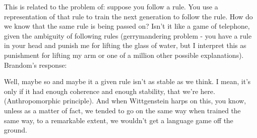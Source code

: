 This is related to the problem of: suppose you follow a rule. You use a
representation of that rule to train the next generation to follow the rule.
How do we know that the same rule is being passed on? Isn't it like a game of
telephone, given the ambiguity of following rules (gerrymandering problem - you
have a rule in your head and punish me for lifting the glass of water, but I
interpret this as punishment for lifting my arm or one of a million other
possible explanations). Brandom's response:

Well, maybe so and maybe it a given rule isn't as stable as we think. I mean,
it's only if it had enough coherence and enough stability, that we're here.
(Anthropomorphic principle). And when Wittgenstein harps on this, you know, unless
as a matter of fact, we tended to go on the same way when trained the same way,
to a remarkable extent, we wouldn't get a language game off the ground.

